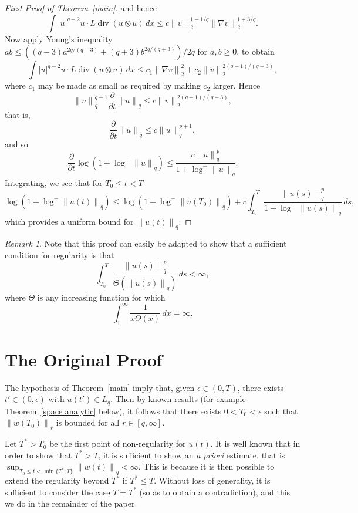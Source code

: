 \documentclass[12pt]{amsart}
\theoremstyle{remark}
\newtheorem{rem}[thm]{Remark}
\newcommand{\smodo}[1]{{\mathopen|#1\mathclose|}}
\newcommand{\snormo}[1]{{\mathopen\|#1\mathclose\|}}
\DeclareMathOperator{\divergence}{div}
\begin{document}
\begin{proof}[First Proof of Theorem~\ref{main}]
and hence
$$ \int \smodo u^{q-2} u \cdot L \divergence (u \otimes u) \, dx
   \le c
   \snormo v_2^{1-1/q} \snormo{\nabla v}_2^{1+3/q} .$$
Now apply Young's inequality $ab \le ((q-3)a^{2q/(q-3)} + (q+3)b^{2q/(q+3)})/2q$
for $a,b \ge 0$, to obtain
$$
   \int \smodo u^{q-2} u \cdot L \divergence (u \otimes u) \, dx
   \le 
   c_1 \snormo{\nabla v}_2^2 + c_2 \snormo v_2^{2(q-1)/(q-3)} ,
$$
where $c_1$ may be made as small as required by making $c_2$ larger.  
Hence
$$ \snormo u_q^{q-1} \frac\partial{\partial t}\snormo u_q
   \le c \snormo v_2^{2(q-1)/(q-3)},$$
that is,
$$ \frac\partial{\partial t}\snormo u_q
   \le c \snormo u_q^{p+1} ,$$
and so
$$ \frac\partial{\partial t}
   \log(1+\log^+\snormo u_q)
   \le 
   \frac{c \snormo u_q^p}{1+\log^+\snormo u_q} .$$
Integrating, we see that for $T_0 \le t < T$
$$ \log(1+\log^+\snormo{u(t)}_q) \le
   \log(1+\log^+\snormo{u(T_0)}_q) + 
   c \int_{T_0}^T \frac{\snormo{u(s)}_q^p}{1+\log^+\snormo{u(s)}_q} \, ds ,$$
which provides a uniform bound for $\snormo{u(t)}_q$.
\end{proof}

\begin{rem}
Note that this proof can easily be adapted to show that a sufficient condition
for regularity is that
$$
   \int_{T_0}^T \frac{\snormo{u(s)}_q^p}{\Theta(\snormo{u(s)}_q)} 
   \, ds < \infty ,$$
where $\Theta$ is any increasing function for which 
$$ \int_1^\infty \frac1{x\Theta(x)} \, dx = \infty .$$
\end{rem}

\section{The Original Proof}

The hypothesis of Theorem~\ref{main} imply that, 
given $\epsilon \in (0,T)$, there exists
$t' \in (0,\epsilon)$ with $u(t') \in L_q$.
Then by known results (for example Theorem~\ref{space analytic} below), 
it follows
that there exists $0 < T_0<\epsilon$ such that 
$\snormo{w(T_0)}_{r}$ is bounded for all $r \in [q,\infty]$.

Let $T^* > T_0$ be the first point of non-regularity for $u(t)$.
It is well known that 
in order to show that $T^* > T$,
it is sufficient to show an \emph{a priori} estimate, that is
$\sup_{T_0 \le t < \min\{T^*,T\}} \snormo{w(t)}_q < \infty$.
This is because it is then possible to extend the regularity beyond
$T^*$ if $T^* \le T$.
Without loss of generality, it is sufficient to consider the case
$T = T^*$ (so as to obtain a contradiction), and this we do
in the remainder of the paper.
\end{document}
